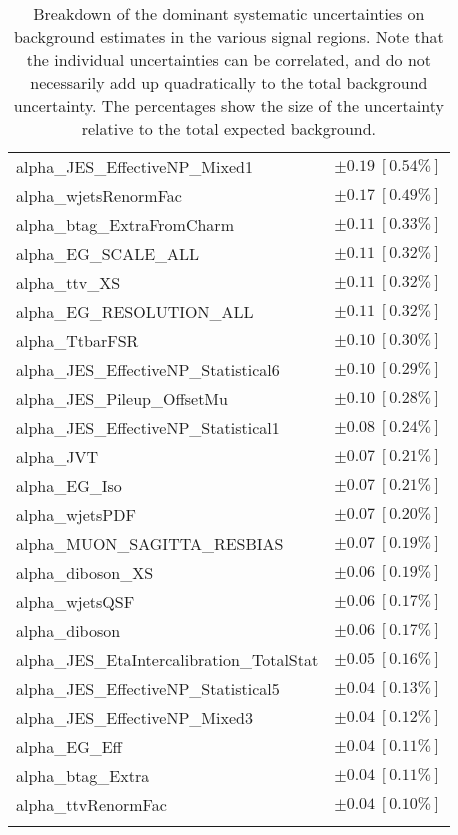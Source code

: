 \begin{table}
\begin{center}
\begin{tabular*}{\textwidth}{@{\extracolsep{\fill}}lc}
alpha\_JES\_EffectiveNP\_Mixed1         & $\pm 0.19\ [0.54\%] $       \\
alpha\_wjetsRenormFac         & $\pm 0.17\ [0.49\%] $       \\
alpha\_btag\_ExtraFromCharm         & $\pm 0.11\ [0.33\%] $       \\
alpha\_EG\_SCALE\_ALL         & $\pm 0.11\ [0.32\%] $       \\
alpha\_ttv\_XS         & $\pm 0.11\ [0.32\%] $       \\
alpha\_EG\_RESOLUTION\_ALL         & $\pm 0.11\ [0.32\%] $       \\
alpha\_TtbarFSR         & $\pm 0.10\ [0.30\%] $       \\
alpha\_JES\_EffectiveNP\_Statistical6         & $\pm 0.10\ [0.29\%] $       \\
alpha\_JES\_Pileup\_OffsetMu         & $\pm 0.10\ [0.28\%] $       \\
alpha\_JES\_EffectiveNP\_Statistical1         & $\pm 0.08\ [0.24\%] $       \\
alpha\_JVT         & $\pm 0.07\ [0.21\%] $       \\
alpha\_EG\_Iso         & $\pm 0.07\ [0.21\%] $       \\
alpha\_wjetsPDF         & $\pm 0.07\ [0.20\%] $       \\
alpha\_MUON\_SAGITTA\_RESBIAS         & $\pm 0.07\ [0.19\%] $       \\
alpha\_diboson\_XS         & $\pm 0.06\ [0.19\%] $       \\
alpha\_wjetsQSF         & $\pm 0.06\ [0.17\%] $       \\
alpha\_diboson         & $\pm 0.06\ [0.17\%] $       \\
alpha\_JES\_EtaIntercalibration\_TotalStat         & $\pm 0.05\ [0.16\%] $       \\
alpha\_JES\_EffectiveNP\_Statistical5         & $\pm 0.04\ [0.13\%] $       \\
alpha\_JES\_EffectiveNP\_Mixed3         & $\pm 0.04\ [0.12\%] $       \\
alpha\_EG\_Eff         & $\pm 0.04\ [0.11\%] $       \\
alpha\_btag\_Extra         & $\pm 0.04\ [0.11\%] $       \\
alpha\_ttvRenormFac         & $\pm 0.04\ [0.10\%] $       \\
\noalign{\smallskip}\hline\noalign{\smallskip}
\end{tabular*}
\end{center}
\caption[Breakdown of uncertainty on background estimates]{
Breakdown of the dominant systematic uncertainties on background estimates in the various signal regions.
Note that the individual uncertainties can be correlated, and do not necessarily add up quadratically to 
the total background uncertainty. The percentages show the size of the uncertainty relative to the total expected background.
\label{table.results.bkgestimate.uncertainties.VRtt1offEM_cuts}}
\end{table}
%